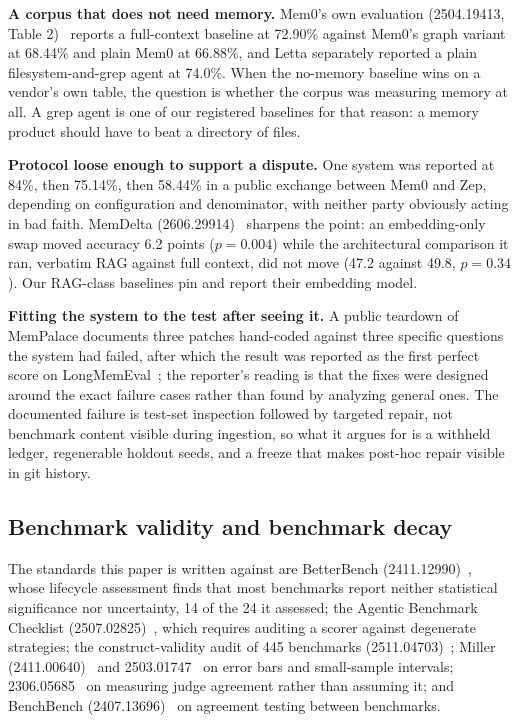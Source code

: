 \documentclass[11pt]{article}
\begin{document}
\textbf{A corpus that does not need memory.} Mem0's own evaluation
(2504.19413, Table 2)~\cite{mem0} reports a full-context baseline at 72.90\% against Mem0's graph variant
at 68.44\% and plain Mem0 at 66.88\%, and Letta separately reported a plain
filesystem-and-grep agent at 74.0\%. When the no-memory baseline wins on a
vendor's own table, the question is whether the corpus was measuring memory at
all. A grep agent is one of our registered baselines for that reason: a memory
product should have to beat a directory of files.

\textbf{Protocol loose enough to support a dispute.} One system was reported at
84\%, then 75.14\%, then 58.44\% in a public exchange between Mem0 and Zep,
depending on configuration and denominator, with neither party obviously acting
in bad faith. MemDelta (2606.29914)~\cite{memdelta} sharpens the point: an embedding-only swap
moved accuracy 6.2 points ($p = 0.004$) while the architectural comparison it
ran, verbatim RAG against full context, did not move (47.2 against 49.8, $p =
0.34$). Our RAG-class baselines pin and report their embedding model.

\textbf{Fitting the system to the test after seeing it.} A public teardown of
MemPalace documents three patches hand-coded against three specific questions
the system had failed, after which the result was reported as the first perfect
score on LongMemEval~\cite{longmemeval}; the reporter's reading is that the fixes were designed
around the exact failure cases rather than found by analyzing general ones. The documented failure is test-set inspection followed by targeted repair, not
benchmark content visible during ingestion, so what it argues for is a withheld
ledger, regenerable holdout seeds, and a freeze that makes post-hoc repair
visible in git history.

\subsection{Benchmark validity and benchmark decay}

The standards this paper is written against are BetterBench
(2411.12990)~\cite{betterbench}, whose lifecycle assessment finds that most
benchmarks report neither statistical significance nor uncertainty, 14 of the 24
it assessed; the Agentic Benchmark Checklist
(2507.02825)~\cite{abc}, which requires auditing a scorer against degenerate
strategies; the construct-validity audit of 445 benchmarks
(2511.04703)~\cite{construct}; Miller (2411.00640)~\cite{miller} and
2503.01747~\cite{bowyer} on error bars and small-sample intervals;
2306.05685~\cite{judge} on measuring judge agreement rather than assuming it; and
BenchBench (2407.13696)~\cite{benchbench} on agreement testing between
benchmarks.
\end{document}
